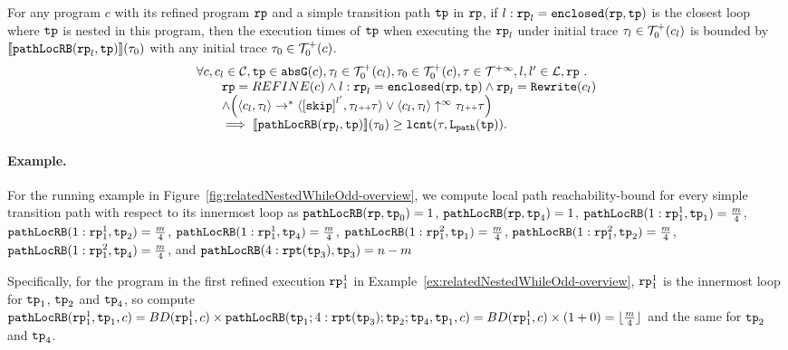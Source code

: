 \begin{lem}
  \label{lem:pathlocalrb-sound}
  For any program $c$ with its refined program $\mathtt{rp}$ and a simple transition path $\mathtt{tp}$ in $\mathtt{rp}$,
  if $l: \mathtt{rp}_l = \mathtt{enclosed}(\mathtt{rp}, \mathtt{tp})$ is the closest loop where $\mathtt{tp}$ is nested in this program,
  then the execution times of $\mathtt{tp}$ when executing the $\mathtt{rp}_l$ under initial trace $\mathtt{\tau}_l \in \mathcal{T}^{+}_0(c_l)$ is bounded by $\llbracket \mathtt{pathLocRB}(\mathtt{rp}_l, \mathtt{tp}) \rrbracket(\mathtt{\tau}_0)$ with any initial trace $\mathtt{\tau}_0 \in \mathcal{T}^{+}_0(c)$.
  \[
    \begin{array}{l}
    \forall c, c_l \in \cdom, \tpath \in \absG(c), 
    \trace_l \in \ftdom_0(c_l), \trace_0 \in \ftdom_0(c), \trace \in \tdom, l, l' \in \ldom, \rprog \st 
    \\ \qquad
    \rprog = REFINE(c)
    \land
    l: \rprog_l = \kw{enclosed}(\rprog, \tpath)
    \land 
    \rprog_l = \algrewrite(c_l)
    \\ \qquad
    \land
    \Big(
    \config{c_l, \trace_l} \rightarrow^* \config{\clabel{\eskip}^{l'}, \trace_l \tracecat \trace}
    \lor \config{c_l, \trace_l} \uparrow^{\infty} \trace_l \tracecat \trace 
    \Big)
    \\ \qquad
    \implies
    \econfig{\outinB(\rprog_l, \tpath)}(\trace_0) \geq \lcounter(\trace, \pathl(\tpath)).
    \end{array}
  \]  
\end{lem}


\paragraph{Example.}
For the running example in Figure~\ref{fig:relatedNestedWhileOdd-overview}, 
we compute local path reachability-bound for every simple transition path with respect to its innermost loop as
$\mathtt{pathLocRB}(\mathtt{rp}, \mathtt{tp}_0) = 1$,
$\mathtt{pathLocRB}(\mathtt{rp}, \mathtt{tp}_4) = 1$,
$\mathtt{pathLocRB}(1: \mathtt{rp}_1^1, \mathtt{tp}_1) = \frac{m}{4}$,
$\mathtt{pathLocRB}(1: \mathtt{rp}_1^1, \mathtt{tp}_2) = \frac{m}{4}$,
$\mathtt{pathLocRB}(1: \mathtt{rp}_1^1, \mathtt{tp}_4) = \frac{m}{4}$,
$\mathtt{pathLocRB}(1: \mathtt{rp}_1^2, \mathtt{tp}_1) = \frac{m}{4}$,
$\mathtt{pathLocRB}(1: \mathtt{rp}_1^2, \mathtt{tp}_2) = \frac{m}{4}$,
$\mathtt{pathLocRB}(1: \mathtt{rp}_1^2, \mathtt{tp}_4) = \frac{m}{4}$, and
$\mathtt{pathLocRB}(4: \mathtt{rpt}(\mathtt{tp}_3), \mathtt{tp}_3) = n - m$ 

Specifically, for the program in the first refined execution $\mathtt{rp}_1^1$ in Example~\ref{ex:relatedNestedWhileOdd-overview}, $\mathtt{rp}_1^1$ is the innermost loop for $\mathtt{tp}_1$, $\mathtt{tp}_2$ and $\mathtt{tp}_4$, 
so compute $\mathtt{pathLocRB}(\mathtt{rp}_1^1, \mathtt{tp}_1, c) = BD(\mathtt{rp}_1^1, c) \times \mathtt{pathLocRB}(\mathtt{tp}_1; 4:\mathtt{rpt}(\mathtt{tp}_3); \mathtt{tp}_2; \mathtt{tp}_4, \mathtt{tp}_1, c)
= BD(\mathtt{rp}_1^1, c) \times (1 + 0) = \lfloor \frac{m}{4} \rfloor $ and the same for $\mathtt{tp}_2$ and $\mathtt{tp}_4$.


